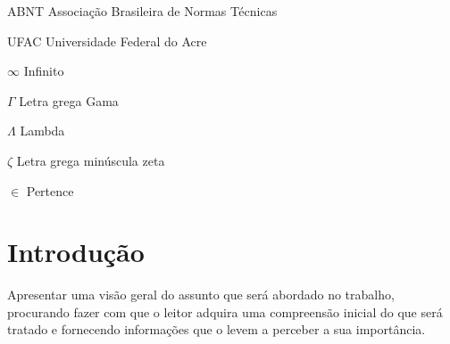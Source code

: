 \documentclass[
    12pt,				       %
    openright,			       %
    oneside,			       %
    a4paper,			       %
    chapter=TITLE,             %
    sumario=tradicional,       %
    english,			        %
    brazil, 				    %
 ]{abntex2}
\begin{document}
\begin{siglas}
	\item[ABNT] Associação Brasileira de Normas Técnicas
	\item[UFAC] Universidade Federal do Acre
\end{siglas}

\begin{simbolos}
    \item[$\infty$] Infinito
    \item[$\Gamma$] Letra grega Gama
    \item[$\Lambda$] Lambda
    \item[$\zeta$] Letra grega minúscula zeta
    \item[$\in$] Pertence
\end{simbolos}

\tableofcontents*
\cleardoublepage


\textual



\pagestyle{simple}


\chapter{Introdução}\label{sec:introducao}
Apresentar uma visão geral do assunto que será abordado no trabalho, procurando fazer com que o leitor adquira uma compreensão inicial do que será tratado e fornecendo informações que o levem a perceber a sua importância.
\end{document}
